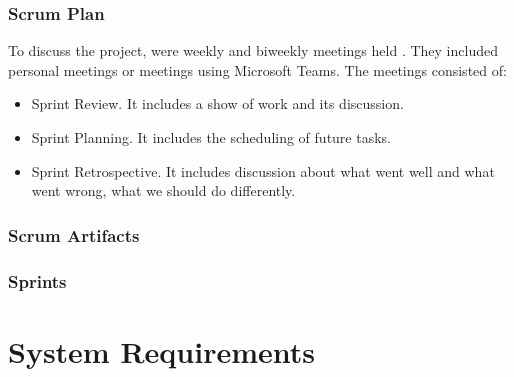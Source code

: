\documentclass{scrartcl}
\begin{document}
  	    \subsubsection{Scrum Plan}
  	    To discuss the project, were weekly and biweekly meetings held . They included personal meetings or meetings using Microsoft Teams. The meetings consisted of:
  	    \begin{itemize}
  	    \item Sprint Review. It includes a show of work and its discussion.
  	    \item Sprint Planning. It includes the scheduling of future tasks.
  	    \item Sprint Retrospective. It includes discussion about what went well and what went wrong, what we should do differently. 
  	    \end{itemize}
  		\subsubsection{Scrum Artifacts }
  		
  		\subsubsection{Sprints}
\section{System Requirements}
\end{document}
